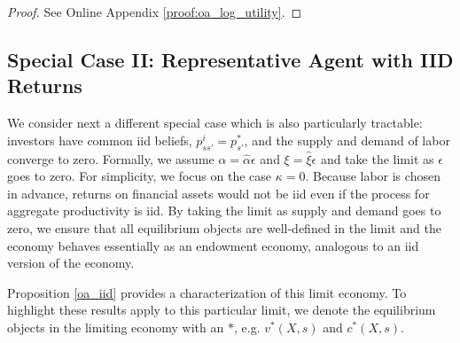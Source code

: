 \begin{proof}
See Online Appendix \ref{proof:oa_log_utility}.
\end{proof}

\subsection{Special Case II: Representative Agent with IID Returns}

We consider next a different special case which is also particularly tractable: investors have common iid beliefs, $p_{ss'}^i = p_{s'}^*$, and the supply and demand of labor converge to zero. Formally, we assume $\alpha = \hat{\alpha} \epsilon$ and $\xi = \hat{\xi} \epsilon$ and take the limit as $\epsilon$ goes to zero. 
For simplicity, we focus on the case $\kappa = 0$. 
Because labor is chosen in advance, returns on financial assets would not be iid even if the process for aggregate productivity is iid. 
By taking the limit as supply and demand goes to zero, we ensure that all equilibrium objects are well-defined in the limit and the economy behaves essentially as an endowment economy, analogous to an iid version of the \citet{MP85} economy.

Proposition \ref{oa_iid} provides a characterization of this limit economy. To highlight these results apply to this particular limit, we denote the equilibrium objects in the limiting economy with an $*$, e.g. $v^*(X,s)$ and $c^*(X,s)$.


